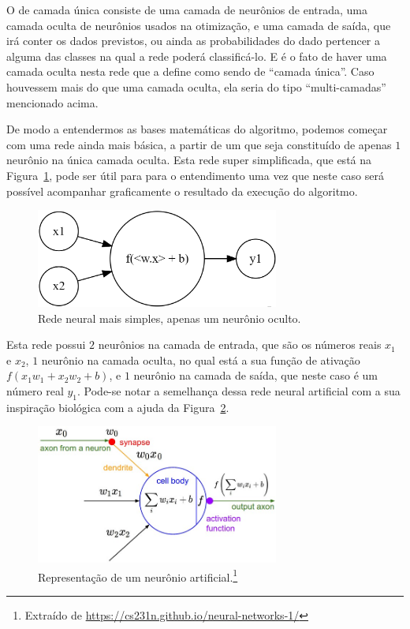 O  de camada única consiste de uma camada de neurônios de entrada, uma camada oculta de neurônios usados na otimização, e uma camada de saída, que irá conter os dados previstos, ou ainda as probabilidades do dado pertencer a alguma das classes na qual a rede poderá classificá-lo. E é o fato de haver uma camada oculta nesta rede que a define como sendo de ``camada única''. Caso houvessem mais do que uma camada oculta, ela seria do tipo ``multi-camadas'' mencionado acima.

De modo a entendermos as bases matemáticas do algoritmo, podemos começar com uma rede ainda mais básica, a partir de um  que seja constituído de apenas $1$ neurônio na única camada oculta. Esta rede super simplificada, que está na Figura~\ref{fig:neuronio}, pode ser útil para para o entendimento uma vez que neste caso será possível acompanhar graficamente o resultado da execução do algoritmo.

\begin{figure}[htb]
\centering
\includegraphics[width=8cm]{figuras/neuronio}
\caption{Rede neural mais simples, apenas um neurônio oculto.}
\label{fig:neuronio}
\end{figure}

Esta rede possui $2$ neurônios na camada de entrada, que são os números reais $x_1$ e $x_2$, $1$ neurônio na camada oculta, no qual está a sua função de ativação $f(x_1w_1 + x_2w_2 + b)$, e $1$ neurônio na camada de saída, que neste caso é um número real $y_1$. Pode-se notar a semelhança dessa rede neural artificial com a sua inspiração biológica com a ajuda da Figura~\ref{fig:neuron_model}. 

\begin{figure}[htb]
\centering
\includegraphics[width=8cm]{figuras/neuron_model}
\caption{Representação de um neurônio artificial.\footnote{Extraído de \url{https://cs231n.github.io/neural-networks-1/}}}
\label{fig:neuron_model}
\end{figure}

